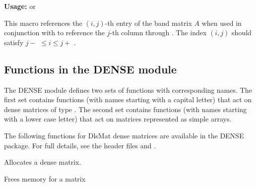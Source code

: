 \documentclass[letterpaper,10pt,english]{sphinxmanual}
\begin{document}

\begin{fulllineitems}
\label{linear_solvers/DLS:BAND_COL_ELEM}
\textbf{Usage:}   or  

This macro references the $(i,j)$-th entry of the band matrix
$A$ when used in conjunction with {\hyperref[linear_solvers/DLS:BAND_COL]{}} to reference
the $j$-th column through . The index $(i,j)$
should satisfy $j-$  $\le i \le j+$ .

\end{fulllineitems}



\subsection{Functions in the DENSE module}
\label{linear_solvers/DLS:functions-in-the-dense-module}
The DENSE module defines two sets of functions with corresponding
names. The first set contains functions (with names starting with a
capital letter) that act on dense matrices of type {\hyperref[linear_solvers/DLS:DlsMat]{}}. The
second set contains functions (with names starting with a lower case
letter) that act on matrices represented as simple arrays.

The following functions for DlsMat dense matrices are available in the
DENSE package. For full details, see the header files
 and .

\begin{fulllineitems}
\label{linear_solvers/DLS:NewDenseMat}
Allocates a {\hyperref[linear_solvers/DLS:DlsMat]{}} dense matrix.

\end{fulllineitems}


\begin{fulllineitems}
\label{linear_solvers/DLS:DestroyMat}
Frees memory for a {\hyperref[linear_solvers/DLS:DlsMat]{}} matrix

\end{fulllineitems}
\end{document}
